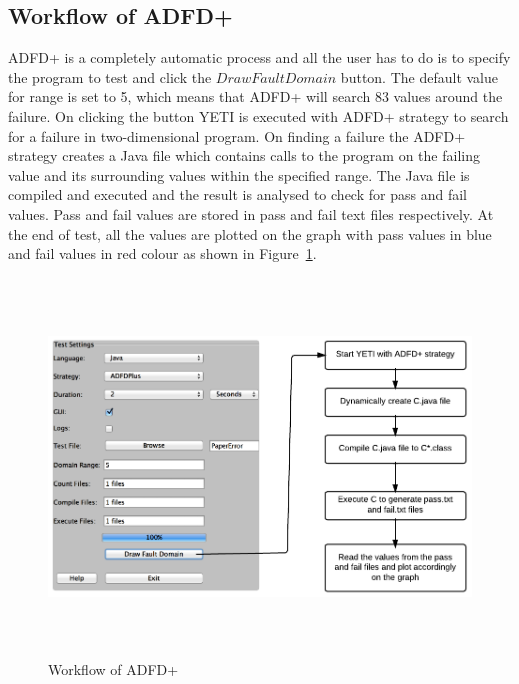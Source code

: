 
\subsection{Workflow of ADFD+}\label{sec:intro6_3}
ADFD+ is a completely automatic process and all the user has to do is to specify the program to test and click the $Draw Fault Domain$ button. The default value for range is set to 5, which means that ADFD+ will search 83 values around the failure. On clicking the button YETI is executed with ADFD+ strategy to search for a failure in two-dimensional program. On finding a failure the ADFD+ strategy creates a Java file which contains calls to the program on the failing value and its surrounding values within the specified range. The Java file is compiled and executed and the result is analysed to check for pass and fail values. Pass and fail values are stored in pass and fail text files respectively. At the end of test, all the values are plotted on the graph with pass values in blue and fail values in red colour as shown in Figure~\ref{fig:Workflow}.
\\


\begin{figure}[ht]
\centering
\includegraphics[width= 14cm,height=10cm]{chapter6/adfdPlusWorkflow.png}
\caption{Workflow of ADFD+}
\label{fig:Workflow}
\end{figure}




